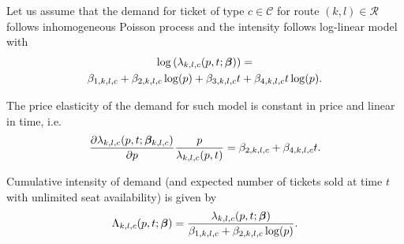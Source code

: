 Let us assume that the demand for ticket of type $c \in \mathcal{C}$ for route $(k,l) \in \mathcal{R}$ follows inhomogeneous Poisson process and the intensity follows log-linear model with
\begin{multline*}
	\log \left( \lambda_{k,l,c} (p, t; \bm{\beta}) \right) = \\
	\beta_{1,k,l,c} + \beta_{2,k,l,c} \log (p) + \beta_{3,k,l,c} t + \beta_{4,k,l,c} t \log (p).
\end{multline*}

The price elasticity of the demand for such model is constant in price and linear in time, i.e.
\[
	\frac{\partial \lambda_{k,l,c} (p,t; \bm{\beta}_{k,l,c})}{\partial p} \frac{p}{\lambda_{k,l,c} (p,t)} = \beta_{2,k,l,c} + \beta_{4,k,l,c} t.
\]

Cumulative intensity of demand (and expected number of tickets sold at time $t$ with unlimited seat availability) is given by
\[
 \Lambda_{k,l,c} (p, t; \bm{\beta}) = \frac { \lambda_{k,l,c} (p, t; \bm{\beta}) } { \beta_{1,k,l,c} + \beta_{2,k,l,c} \log (p) }.
\]
